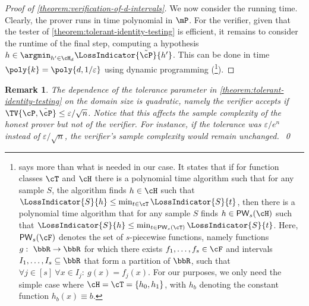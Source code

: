 \documentclass[11pt]{article}
\newtheorem{remark}[theorem]{Remark}
\begin{document}
\begin{proof}[Proof of \cref{theorem:verification-of-d-intervals}]
	We now consider %
the running time.  %
Clearly, the prover runs in time polynomial in $\mP$. For the verifier, given that the tester of \cref{theorem:tolerant-identity-testing} is efficient, it remains to consider the runtime of the final step, computing a hypothesis $h \in \argmin_{h' \in \cH_d} \LossIndicator{\tilde{\cP}}{h'}$. This can be done in time $\poly{k} = \poly{d, 1/\varepsilon}$ using dynamic programming %
(\cite[Theorem 4]{DBLP:journals/ml/KearnsSS94}\footnote{%
%
%
\cite[Theorem 4]{DBLP:journals/ml/KearnsSS94}  %
%
says more than what is needed in our case. It states that if for function classes $\cT$ and $\cH$ there is a polynomial time algorithm such that for any sample $S$, the algorithm finds $h \in \cH$ such that $\LossIndicator{S}{h} \leq \min_{t \in \cT}\LossIndicator{S}{t}$, then there is a polynomial time algorithm that for any sample $S$ finds $h \in \mathsf{PW}_s(\cH)$ such that $\LossIndicator{S}{h} \leq \min_{t \in \mathsf{PW}_s(\cT)}\LossIndicator{S}{t}$. Here, $\mathsf{PW}_s(\cF)$ denotes the set of $s$-piecewise functions, namely functions $g: ~ \bbR \to \bbR$ for which there exists $f_1,\dots,f_s \in \cF$ and intervals $I_1,\dots,I_s \subseteq \bbR$ that form a partition of $\bbR$, such that $\forall j \in [s] ~ \forall x \in I_j: ~ g(x) = f_j(x)$. For our purposes, we only need the simple case where $\cH = \cT = \{h_0,h_1\}$, with $h_b$ denoting the constant function $h_b(x) \equiv b$.%
	}).
\end{proof}

%

\begin{remark}
	The dependence of the tolerance parameter in \cref{theorem:tolerant-identity-testing} on the domain size is quadratic, namely the verifier accepts if $\TV{\cP,\tilde{\cP}} \leq \varepsilon/\sqrt{n}$. Notice that this affects the sample complexity of the honest prover but not of the verifier. For instance, if the tolerance was $\varepsilon/e^n$ instead of $\varepsilon/\sqrt{n}$, the verifier's sample complexity would remain unchanged.~\qed
\end{remark}

%

%
\end{document}
